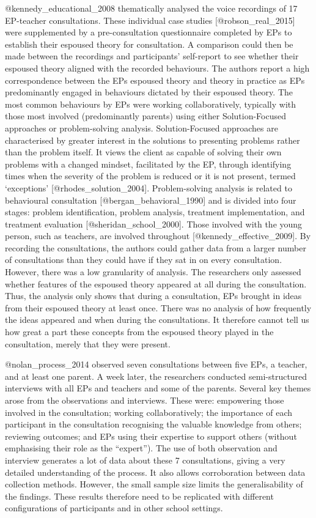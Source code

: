\documentclass[
]{article}
\begin{document}
@kennedy\_educational\_2008 thematically analysed the voice recordings
of 17 EP-teacher consultations. These individual case studies
{[}@robson\_real\_2015{]} were supplemented by a pre-consultation
questionnaire completed by EPs to establish their espoused theory for
consultation. A comparison could then be made between the recordings and
participants' self-report to see whether their espoused theory aligned
with the recorded behaviours. The authors report a high correspondence
between the EPs espoused theory and theory in practice as EPs
predominantly engaged in behaviours dictated by their espoused theory.
The most common behaviours by EPs were working collaboratively,
typically with those most involved (predominantly parents) using either
Solution-Focused approaches or problem-solving analysis.
Solution-Focused approaches are characterised by greater interest in the
solutions to presenting problems rather than the problem itself. It
views the client as capable of solving their own problems with a changed
mindset, facilitated by the EP, through identifying times when the
severity of the problem is reduced or it is not present, termed
`exceptions' {[}@rhodes\_solution\_2004{]}. Problem-solving analysis is
related to behavioural consultation {[}@bergan\_behavioral\_1990{]} and
is divided into four stages: problem identification, problem analysis,
treatment implementation, and treatment evaluation
{[}@sheridan\_school\_2000{]}. Those involved with the young person,
such as teachers, are involved throughout
{[}@kennedy\_effective\_2009{]}. By recording the consultations, the
authors could gather data from a larger number of consultations than
they could have if they sat in on every consultation. However, there was
a low granularity of analysis. The researchers only assessed whether
features of the espoused theory appeared at all during the consultation.
Thus, the analysis only shows that during a consultation, EPs brought in
ideas from their espoused theory at least once. There was no analysis of
how frequently the ideas appeared and when during the consultations. It
therefore cannot tell us how great a part these concepts from the
espoused theory played in the consultation, merely that they were
present.

@nolan\_process\_2014 observed seven consultations between five EPs, a
teacher, and at least one parent. A week later, the researchers
conducted semi-structured interviews with all EPs and teachers and some
of the parents. Several key themes arose from the observations and
interviews. These were: empowering those involved in the consultation;
working collaboratively; the importance of each participant in the
consultation recognising the valuable knowledge from others; reviewing
outcomes; and EPs using their expertise to support others (without
emphasising their role as the ``expert''). The use of both observation
and interview generates a lot of data about these 7 consultations,
giving a very detailed understanding of the process. It also allows
corroboration between data collection methods. However, the small sample
size limits the generalisability of the findings. These results
therefore need to be replicated with different configurations of
participants and in other school settings.
\end{document}
